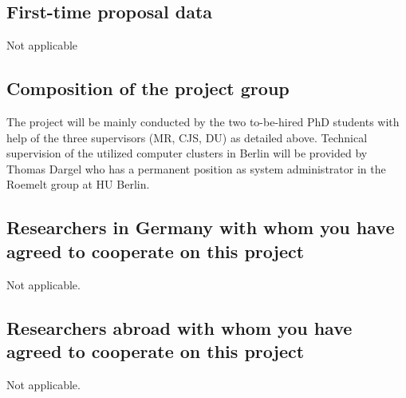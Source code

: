 \documentclass[a4paper,11pt,headings=normal]{scrartcl}
\begin{document}
\subsection{First-time proposal data}
Not applicable

\subsection{Composition of the project group}
The project will be mainly conducted by the two to-be-hired PhD students with 
help of the three supervisors (MR, CJS, DU) as detailed above.  Technical 
supervision of the utilized computer clusters in Berlin will be provided by 
Thomas Dargel who has a permanent position as system administrator in the 
Roemelt group at HU Berlin. 

\subsection{Researchers in Germany with whom you have agreed to cooperate on this project}
Not applicable.

\subsection{Researchers abroad with whom you have agreed to cooperate on this 
project}
Not applicable.
\end{document}
